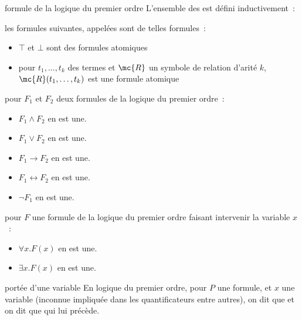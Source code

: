 \begin{adjustwidth}{-3cm}{-3cm}
\begin{definition}{7.22}{formule de la logique du premier ordre}
    L'ensemble des  est défini inductivement~:
    \begin{enumeratebf}
        \item les formules suivantes, appelées  sont de telles formules~:
        \begin{itemize}
            \item $\top$ et $\bot$ sont des formules atomiques
            \item pour $t_1, \dots, t_k$ des termes et $\mc{R}$ un symbole de relation d'arité $k$, $\mc{R}(t_1,\dots, t_k)$ est une formule atomique
        \end{itemize}
        \item pour $F_1$ et $F_2$ deux formules de la logique du premier ordre~: 
        \begin{itemize}
            \item $F_1 \wedge F_2$ en est une.
            \item $F_1 \vee F_2$ en est une.
            \item $F_1 \rightarrow F_2$ en est une.
            \item $F_1 \leftrightarrow F_2$ en est une.
            \item $\lnot F_1$ en est une.
        \end{itemize}
        \item pour $F$ une formule de la logique du premier ordre faisant intervenir la variable $x$~:
        \begin{itemize}
            \item $\forall x.F(x)$ en est une.
            \item $\exists x.F(x)$ en est une.
        \end{itemize}
    \end{enumeratebf}
\end{definition}

\begin{definition}{7.23}{portée d'une variable}
    En logique du premier ordre, pour $P$ une formule, et $x$ une variable (inconnue impliquée dans les quantificateurs entre autres), on dit que  et on dit que  qui lui précède.
\end{definition}


\end{adjustwidth}
